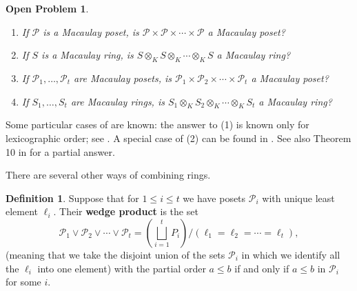 \documentclass[11pt]{amsart}
\renewcommand{\P}{{\mathcal P}}
\theoremstyle{plain} %
\newtheorem{oprobl}{Open Problem}
\theoremstyle{definition}
\newtheorem{defn}[thm]{Definition}
\theoremstyle{remark}
\numberwithin{equation}{section}  %
\begin{document}
\begin{tcolorbox}[reset]
\begin{oprobl}\label{oprobl 1}
\begin{enumerate}
\item If $\P$ is a Macaulay poset,  is $\P\times \P\times \cdots \times \P$ a Macaulay poset?
\item If $S$ is a Macaulay ring, is  $S\otimes_K S\otimes_K \cdots \otimes_K S$  a Macaulay ring?
\item If $\P_1, \ldots, \P_t$ are Macaulay posets,  is $\P_1\times \P_2\times \cdots \times \P_t$ a Macaulay poset?
\item If $S_1, \ldots, S_t$ are Macaulay rings,  is $S_1\otimes_K S_2\otimes_K \cdots \otimes_K S_t$ a Macaulay ring?
\end{enumerate}
\end{oprobl}
\end{tcolorbox}

Some particular cases of  are known: the answer to (1) is known only for lexicographic order; see \cite{uwsuper}. A special case of (2) can be found in \cite[Theorem 4.1]{Mermin}. See also Theorem 10 in \cite{survey}  for a partial answer.

There are several other ways of combining rings.

\begin{tcolorbox}
\begin{defn}
Suppose that for $1\leq i\leq t$ we have posets $\P_i$ with unique least element $\ell_i$. Their {\bf wedge product} is the set
\[
\P_1\vee \P_2 \vee \cdots \vee  \P_t=\left(\bigsqcup_{i=1}^t P_i \right)/ (\ell_1=\ell_2=\cdots  =\ell_t),
\]
(meaning that we take the disjoint union of the sets $\P_i$ in which we identify all the $\ell_i$ into one element)
with the partial order $a\leq b$ if and only if $a\leq b$ in $\P_i$ for some $i$.
\end{defn}
\end{tcolorbox}
\end{document}
